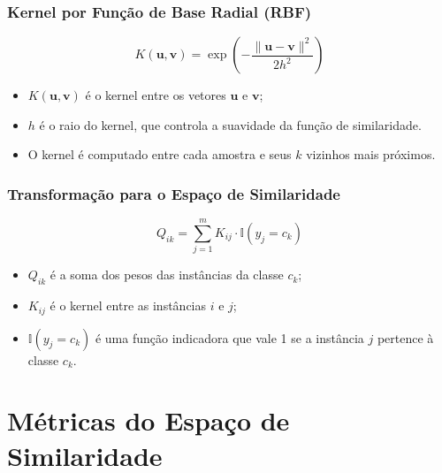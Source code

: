 \begin{frame}

    \frametitle{Kernel por Função de Base Radial (RBF)}

    \begin{equation}
        K(\mathbf{u}, \mathbf{v}) = \exp\left(-\frac{\|\mathbf{u} - \mathbf{v}\|^2}{2h^2}\right)
    \end{equation}

    \begin{itemize}
        \item $K(\mathbf{u}, \mathbf{v})$ é o kernel entre os vetores $\mathbf{u}$ e $\mathbf{v}$;
        \item $h$ é o raio do kernel, que controla a suavidade da função de similaridade.
        \item O kernel é computado entre cada amostra e seus $k$ vizinhos mais próximos.
    \end{itemize}

\end{frame}

\begin{frame}

    \frametitle{Transformação para o Espaço de Similaridade}

    \begin{equation}
        Q_{ik} = \sum_{j=1}^{m} K_{ij} \cdot \mathbb{I}(y_j = c_k)
    \end{equation}

    \begin{itemize}
        \item $Q_{ik}$ é a soma dos pesos das instâncias da classe $c_k$;
        \item $K_{ij}$ é o kernel entre as instâncias $i$ e $j$;
        \item $\mathbb{I}(y_j = c_k)$ é uma função indicadora que vale 1 se a instância $j$ pertence à classe $c_k$.
    \end{itemize}

\end{frame}

\section{Métricas do Espaço de Similaridade}

